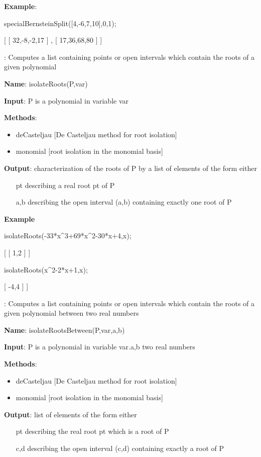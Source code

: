 \documentclass{article}
\begin{document}
{\bf Example}:

specialBernsteinSplit([4,-6,7,10],0,1);

[ [ 32,-8,-2,17 ] , [ 17,36,68,80 ] ]
  

:
  Computes a list containing points or open intervals which contain the roots
  of a given polynomial
  
{\bf Name}: isolateRoots(P,var)
  
{\bf Input}: P is a polynomial in variable var
  
{\bf  Methods}:
  \begin{itemize}
    \item deCasteljau [De Casteljau method for root isolation]
    \item {\color{grey} monomial [root isolation in the monomial basis]}
  \end{itemize}
  
  {\bf Output}: characterization of the roots of P by a list of elements of the
  form either
  \begin{itemize}
    \item [pt] describing a real root pt of P
    \item [a,b] describing the open interval (a,b) containing exactly one root
    of P
  \end{itemize}
  
{\bf Example}

isolateRoots(-33*x\^{}3+69*x\^{}2-30*x+4,x);

[ [ 1,2 ] ]

isolateRoots(x\^{}2-2*x+1,x);

 [ -4,4 ] ]

:
  Computes a list containing points or open intervals which contain the roots
  of a given polynomial between two real numbers
  
{\bf Name}: isolateRootsBetween(P,var,a,b)
  
{\bf Input}: P is a polynomial in variable var.a,b two real numbers
  
{\bf Methods}:
  \begin{itemize}
    \item deCasteljau [De Casteljau method for root isolation]
    \item {\color{grey} monomial [root isolation in the monomial basis]}
  \end{itemize}
  
 {\bf  Output}: list of elements of the form either
  \begin{itemize}
    \item [pt] describing the real root pt which is a root of P
    \item [c,d] describing the open interval (c,d) containing exactly a root
    of P
  \end{itemize}
  
\end{document}
